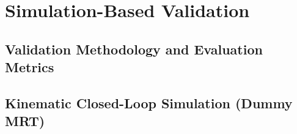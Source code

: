 \chapter{Simulation-Based Validation}
\label{ch:simulation}

\section{Validation Methodology and Evaluation Metrics}
\label{sec:sim-methodology}


\section{Kinematic Closed-Loop Simulation (Dummy MRT)}
\label{sec:sim-dummy}

